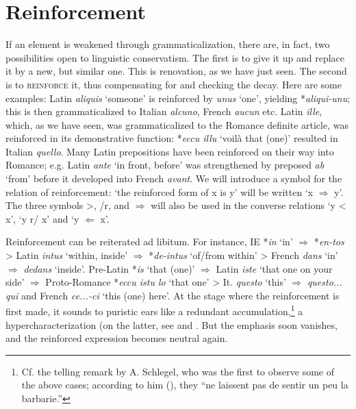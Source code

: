 \section{Reinforcement} \label{sec:2.5}

If an element is weakened through grammaticalization, there are, in fact, two possibilities open to linguistic conservatism. The first is to give it up and replace it by a new, but similar one. This is renovation, as we have just seen. The second is to \textsc{reinforce} it, thus compensating for and checking the decay. Here are some examples: Latin \textit{aliquis} ‘someone’ is reinforced by \textit{unus} ‘one’, yielding *\textit{aliqui-unu}; this is then grammaticalized to Italian \textit{alcuno}, French \textit{aucun} etc. Latin \textit{ille}, which, as we have seen, was grammaticalized to the Romance definite article, was reinforced in its demonstrative function: *\textit{eccu illu} ‘voilà that (one)’ resulted in Italian \textit{quello}. Many Latin prepositions have been reinforced on their way into Romance; e.g. Latin \textit{ante} ‘in front, before’ was strengthened by preposed \textit{ab} ‘from’ before it developed into French \textit{avant}. We will introduce a symbol for the relation of reinforcement: ‘the reinforced form of x is y’ will be written ‘x $\Rightarrow $ y’. The three symbols {\textgreater}, /r, and $\Rightarrow $ will also be used in the converse relations ‘y {\textless} x’, ‘y r/ x’ and ‘y $\Leftarrow $ x’.

Reinforcement can be reiterated ad libitum. For instance, IE *\textit{in} ‘in’ $\Rightarrow $ *\textit{en-tos} {\textgreater} Latin \textit{intus} ‘within, inside’ $\Rightarrow $ *\textit{de-intus} ‘of/from within’ {\textgreater} French \textit{dans} ‘in’ $\Rightarrow $ \textit{dedans} ‘inside’. Pre-Latin *\textit{is} ‘that (one)’ $\Rightarrow $ Latin \textit{iste} ‘that one on your side’ $\Rightarrow $ Proto-Romance *\textit{eccu istu lo} ‘that one’ {\textgreater} It. \textit{questo} ‘this’ $\Rightarrow $ \textit{questo... qui} and French \textit{ce...-ci} ‘this (one) here’. At the stage where the reinforcement is first made, it sounds to puristic ears like a redundant accumulation,\footnote{Cf. the telling remark by A. Schlegel, who was the first to observe some of the above cases; according to him (\citeyear[30]{Schlegel1818}), they “ne laissent pas de sentir un peu la barbarie.”} a hypercharacterization (on the latter, see \citet{Malkiel1957} and \citet[Ch.~IV]{Tauli1966}. But the emphasis soon vanishes, and the reinforced expression becomes neutral again.


